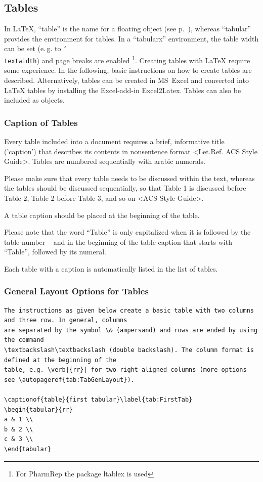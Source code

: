 \documentclass{pharmrep}
\newcommand{\PharmRep}{\textsf{PharmRep}\xspace}
\DeclareRobustCommand\cs[1]{\texttt{\char`\\#1}}
\newcommand{\pkg}[1]{\textsf{#1}}
\newcommand{\prog}[1]{{#1}}
\newcommand{\eg}{e.\,g.\xspace}
\begin{document}
\subsection{Tables}
In \LaTeX{}, \enquote{table} is the name for a floating object (see p.~\pageref{subsubsec:TableFloating}), whereas
\enquote{tabular} provides the environment for tables. In a \enquote{tabularx} environment, the table width can be set (\eg
to \cs{textwidth}) and page breaks are enabled \footnote{For \PharmRep the package \pkg{ltablex} is used}.
Creating tables with \LaTeX{} require some experience. In the following, basic instructions on how to create
tables are described. Alternatively, tables can be created in MS~Excel and converted into \LaTeX{} tables by
installing the Excel-add-in \prog{Excel2Latex}. Tables can also be included as objects.

\subsubsection{Caption of Tables}
Every table included into a document requires a brief, informative title ('caption') that describes its
contents in nonsentence format <Let.Ref. ACS Style Guide>.  Tables are numbered sequentially with
arabic numerals.

Please make sure that every table needs to be discussed within the text, whereas the tables should be
discussed sequentially, so that Table 1 is discussed before Table 2, Table 2 before Table 3, and so on
<ACS Style Guide>.

A table caption should be placed at the beginning of the table.

Please note that the word ``Table'' is only capitalized when it is followed by the table number -- and in the
beginning of the table caption that starts with ``Table'', followed by its numeral.

Each table with a caption is automatically listed in the list of tables.

\subsubsection{General Layout Options for Tables}
\begin{verbatim}
The instructions as given below create a basic table with two columns and three row. In general, columns
are separated by the symbol \& (ampersand) and rows are ended by using the command
\textbackslash\textbackslash (double backslash). The column format is defined at the beginning of the
table, e.g. \verb|{rr}| for two right-aligned columns (more options see \autopageref{tab:TabGenLayout}).

\captionof{table}{first tabular}\label{tab:FirstTab}
\begin{tabular}{rr}
a & 1 \\
b & 2 \\
c & 3 \\
\end{tabular}
\end{verbatim}
\end{document}
